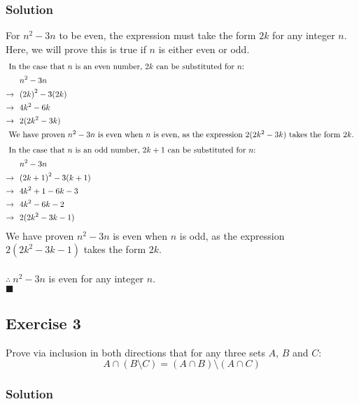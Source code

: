 \documentclass[12pt]{article}
\begin{document}
\subsubsection*{Solution}

For $n^{2}-3n$ to be even, the expression must take the form $2k$ for any integer $n$. Here, we will prove this is true if $n$ is either even or odd.
\begin{align*}
  \intertext{ In the case that $n$ is an even number, $2k$ can be substituted for $n$: }
  & n^{2}-3n \\
  \rightarrow\ \ & {(2k)}^{2}-3(2k) \\
  \rightarrow\ \ & 4k^{2}-6k \\
  \rightarrow\ \ & 2{(2k^{2}-3k)} \\
  \intertext{ We have proven $n^{2}-3n$ is even when $n$ is even, as the expression $2{(2k^{2}-3k)}$ takes the form $2k$. }
  \intertext{ In the case that $n$ is an odd number, $2k+1$ can be substituted for $n$: }
  & n^{2}-3n \\
  \rightarrow\ \ & {(2k+1)}^{2}-3(k+1) \\
  \rightarrow\ \ & 4k^{2}+1-6k-3 \\
  \rightarrow\ \ & 4k^{2}-6k-2 \\
  \rightarrow\ \ & 2{(2k^{2}-3k-1)}
\end{align*}
We have proven $n^{2}-3n$ is even when $n$ is odd, as the expression $2{(2k^{2}-3k-1)}$ takes the form $2k$.
\\\\
$\therefore\ n^{2}-3n$ is even for any integer $n$.
\\\null\hfill $\blacksquare$
\pagebreak

\subsection*{Exercise 3}

Prove via inclusion in both directions that for any three sets $A$, $B$ and $C$:
\[ A \cap (B \setminus C) = (A \cap B) \setminus (A \cap C) \]

\subsubsection*{Solution}
\end{document}
